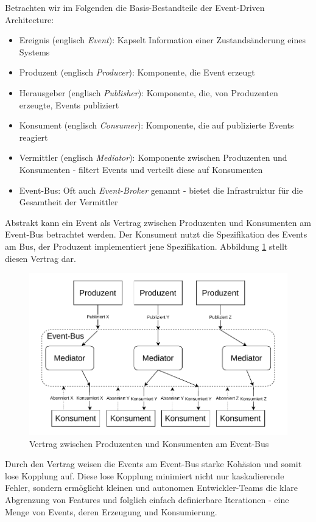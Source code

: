 \documentclass[acmtog]{acmart}
\begin{document}
Betrachten wir im Folgenden die Basis-Bestandteile der Event-Driven Architecture:
\begin{itemize}
  \item Ereignis (englisch \textit{Event}): Kapselt Information einer Zustandsänderung eines Systems
  \item Produzent (englisch \textit{Producer}): Komponente, die Event erzeugt
  \item Herausgeber (englisch \textit{Publisher}): Komponente, die, von Produzenten erzeugte, Events publiziert
  \item Konsument (englisch \textit{Consumer}): Komponente, die auf publizierte Events reagiert
  \item Vermittler (englisch \textit{Mediator}): Komponente zwischen Produzenten und Konsumenten - filtert Events und verteilt diese auf Konsumenten
  \item Event-Bus: Oft auch \textit{Event-Broker} genannt - bietet die Infrastruktur für die Gesamtheit der Vermittler
\end{itemize}
Abstrakt kann ein Event als Vertrag zwischen Produzenten und Konsumenten am Event-Bus betrachtet werden.
Der Konsument nutzt die Spezifikation des Events am Bus, der Produzent implementiert jene Spezifikation.
Abbildung \ref{fig:eda} stellt diesen Vertrag dar.

\begin{figure}[!h]
  \centering
  \includegraphics[width=\linewidth]{images/eda/eda.drawio}
  \caption{Vertrag zwischen Produzenten und Konsumenten am Event-Bus}
  \label{fig:eda}
\end{figure}

Durch den Vertrag weisen die Events am Event-Bus starke Kohäsion und somit lose Kopplung auf.
Diese lose Kopplung minimiert nicht nur kaskadierende Fehler, sondern ermöglicht kleinen und autonomen Entwickler-Teams
die klare Abgrenzung von Features und folglich einfach definierbare Iterationen - eine Menge von Events, deren Erzeugung und Konsumierung.
\end{document}

